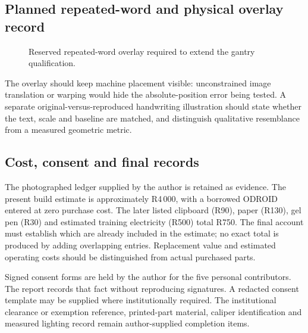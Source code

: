 \subsection{Planned repeated-word and physical overlay record}
\label{app:res-overlay}
\begin{figure}[!htbp]\centering
{}
\caption{Reserved repeated-word overlay required to extend the gantry qualification.}\label{fig:res-overlay-pending}\end{figure}
The overlay should keep machine placement visible: unconstrained image translation or warping would hide the absolute-position error being tested. A separate original-versus-reproduced handwriting illustration should state whether the text, scale and baseline are matched, and distinguish qualitative resemblance from a measured geometric metric.

\subsection{Cost, consent and final records}
The photographed ledger supplied by the author is retained as evidence. The present build estimate is approximately R4\,000, with a borrowed ODROID entered at zero purchase cost. The later listed clipboard (R90), paper (R130), gel pen (R30) and estimated training electricity (R500) total R750. The final account must establish which are already included in the estimate; no exact total is produced by adding overlapping entries. Replacement value and estimated operating costs should be distinguished from actual purchased parts.

Signed consent forms are held by the author for the five personal contributors. The report records that fact without reproducing signatures. A redacted consent template may be supplied where institutionally required. The institutional clearance or exemption reference, printed-part material, caliper identification and measured lighting record remain author-supplied completion items.

